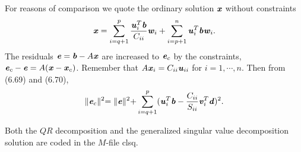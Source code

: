 For reasons of comparison we quote the ordinary solution $\textbf{\textit{x}}$ without constraints
\begin{align}
\textbf{\textit{x}} = 
\sum_{i=q+1}^p\dfrac{\textbf{\textit{u}}^{T}_{i}\textbf{\textit{b}}}{C_{ii}}\textbf{\textit{w}}_{i} + 
\sum_{i=p+1}^n\textbf{\textit{u}}^{T}_{i}\textbf{\textit{b}}\textbf{\textit{w}}_{i}.
\end{align}
The residuals $ \textbf{\textit{e}} = \textbf{\textit{b}}-A\textbf{\textit{x}}$ are increased to $\textbf{\textit{e}}_{c}$ by the constraints, $\textbf{\textit{e}}_{c} - \textbf{\textit{e}} = A(\textbf{\textit{x}} -\textbf{\textit{x}}_{c}) $. Remember that $ A\textbf{\textit{x}}_{i} = C_{ii}\textbf{\textit{u}}_{ii}$ for $i=1,\cdots,n$. Then from (6.69) and (6.70),
\begin{align*}
\lVert \textbf{\textit{e}}_{c} \lVert^{2} =
\lVert \textbf{\textit{e}} \lVert^{2} +
\sum_{i=q+1}^p(\textbf{\textit{u}}^{T}_{i}\textbf{\textit{b}} -
\dfrac{C_{ii}}{S_{ii}} \textbf{\textit{v}}^{T}_{i}\textbf{\textit{d}}
)^{2}.
\end{align*}

    Both the $QR$ decomposition and the generalized singular value decomposition solution are coded in the $M$-file clsq.
    
